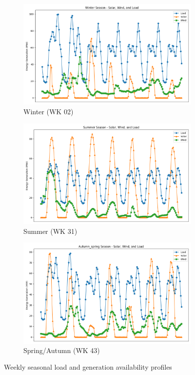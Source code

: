 \begin{figure}[h]
  \centering
  \begin{subfigure}[b]{0.32\linewidth}
     \includegraphics[width=0.8\linewidth]{images/winter_season_plot.png}
     
     \caption{Winter (WK 02)}
     \label{fig:winter_season}
  \end{subfigure}
  \hfill
  \begin{subfigure}[b]{0.32\linewidth}
     \includegraphics[width=0.8\linewidth]{images/summer_season_plot.png}
     \caption{Summer (WK 31)}
     \label{fig:summer_season}
  \end{subfigure}
  \hfill
  \begin{subfigure}[b]{0.32\linewidth}
     \includegraphics[width=0.8\linewidth]{images/autumn_spring_season_plot.png}
     \caption{Spring/Autumn (WK 43)}
     \label{fig:autumn_spring_season}
  \end{subfigure}
  \caption{Weekly seasonal load and generation availability profiles}
  \label{fig:weekly_seasonal_profiles}
\end{figure}


